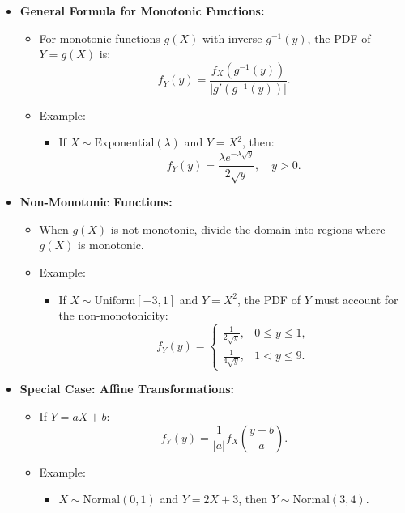 \documentclass{article}
\begin{document}
\begin{itemize}
  \item \textbf{General Formula for Monotonic Functions:}
    \begin{itemize}
      \item For monotonic functions $g(X)$ with inverse $g^{-1}(y)$, the PDF of $Y = g(X)$ is:
        \[
          f_Y(y) = \frac{f_X(g^{-1}(y))}{\lvert g'(g^{-1}(y)) \rvert}.
        \]
      \item Example:
        \begin{itemize}
          \item If $X \sim \text{Exponential}(\lambda)$ and $Y = X^2$, then:
            \[
              f_Y(y) = \frac{\lambda e^{-\lambda \sqrt{y}}}{2\sqrt{y}}, \quad y > 0.
            \]
        \end{itemize}
    \end{itemize}

  \item \textbf{Non-Monotonic Functions:}
    \begin{itemize}
      \item When $g(X)$ is not monotonic, divide the domain into regions where $g(X)$ is monotonic.
      \item Example:
        \begin{itemize}
          \item If $X \sim \text{Uniform}[-3, 1]$ and $Y = X^2$, the PDF of $Y$ must account for the non-monotonicity:
            \[
              f_Y(y) =
              \begin{cases}
                \frac{1}{2\sqrt{y}}, & 0 \leq y \leq 1, \\
                \frac{1}{4\sqrt{y}}, & 1 < y \leq 9.
              \end{cases}
            \]
        \end{itemize}
    \end{itemize}

  \item \textbf{Special Case: Affine Transformations:}
    \begin{itemize}
      \item If $Y = aX + b$:
        \[
          f_Y(y) = \frac{1}{\lvert a \rvert} f_X\left(\frac{y-b}{a}\right).
        \]
      \item Example:
        \begin{itemize}
          \item $X \sim \text{Normal}(0, 1)$ and $Y = 2X + 3$, then $Y \sim \text{Normal}(3, 4)$.
        \end{itemize}
    \end{itemize}


\end{itemize}
\end{document}
